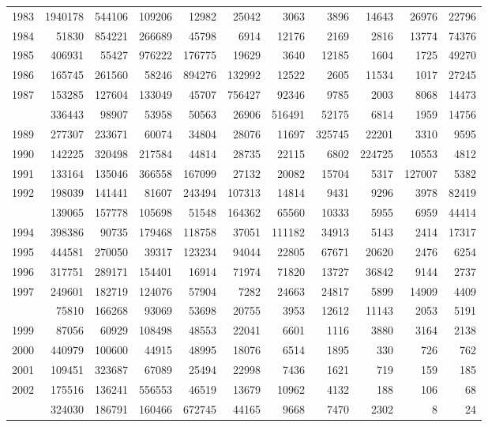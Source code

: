 \documentclass[
]{article}
\begin{document}
\begin{longtable}[t]{lrrrrrrrrrr}
1983 & 1940178 & 544106 & 109206 & 12982 & 25042 & 3063 & 3896 & 14643 & 26976 & 22796\\
1984 & 51830 & 854221 & 266689 & 45798 & 6914 & 12176 & 2169 & 2816 & 13774 & 74376\\
1985 & 406931 & 55427 & 976222 & 176775 & 19629 & 3640 & 12185 & 1604 & 1725 & 49270\\
1986 & 165745 & 261560 & 58246 & 894276 & 132992 & 12522 & 2605 & 11534 & 1017 & 27245\\
1987 & 153285 & 127604 & 133049 & 45707 & 756427 & 92346 & 9785 & 2003 & 8068 & 14473\\
\addlinespace
1988 & 336443 & 98907 & 53958 & 50563 & 26906 & 516491 & 52175 & 6814 & 1959 & 14756\\
1989 & 277307 & 233671 & 60074 & 34804 & 28076 & 11697 & 325745 & 22201 & 3310 & 9595\\
1990 & 142225 & 320498 & 217584 & 44814 & 28735 & 22115 & 6802 & 224725 & 10553 & 4812\\
1991 & 133164 & 135046 & 366558 & 167099 & 27132 & 20082 & 15704 & 5317 & 127007 & 5382\\
1992 & 198039 & 141441 & 81607 & 243494 & 107313 & 14814 & 9431 & 9296 & 3978 & 82419\\
\addlinespace
1993 & 139065 & 157778 & 105698 & 51548 & 164362 & 65560 & 10333 & 5955 & 6959 & 44414\\
1994 & 398386 & 90735 & 179468 & 118758 & 37051 & 111182 & 34913 & 5143 & 2414 & 17317\\
1995 & 444581 & 270050 & 39317 & 123234 & 94044 & 22805 & 67671 & 20620 & 2476 & 6254\\
1996 & 317751 & 289171 & 154401 & 16914 & 71974 & 71820 & 13727 & 36842 & 9144 & 2737\\
1997 & 249601 & 182719 & 124076 & 57904 & 7282 & 24663 & 24817 & 5899 & 14909 & 4409\\
\addlinespace
1998 & 75810 & 166268 & 93069 & 53698 & 20755 & 3953 & 12612 & 11143 & 2053 & 5191\\
1999 & 87056 & 60929 & 108498 & 48553 & 22041 & 6601 & 1116 & 3880 & 3164 & 2138\\
2000 & 440979 & 100600 & 44915 & 48995 & 18076 & 6514 & 1895 & 330 & 726 & 762\\
2001 & 109451 & 323687 & 67089 & 25494 & 22998 & 7436 & 1621 & 719 & 159 & 185\\
2002 & 175516 & 136241 & 556553 & 46519 & 13679 & 10962 & 4132 & 188 & 106 & 68\\
\addlinespace
2003 & 324030 & 186791 & 160466 & 672745 & 44165 & 9668 & 7470 & 2302 & 8 & 24\\

\end{longtable}
\end{document}
